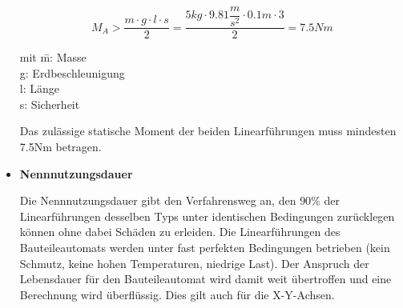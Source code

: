 \begin{itemize}
\begin{figure}[htbp]
\end{figure}


\[M_A>\dfrac{m\cdot g \cdot l \cdot s}{2}=\dfrac{5kg\cdot 9.81\dfrac{m}{s^2}\cdot 0.1m\cdot 3}{2}=7.5Nm\]


\begin{tabbing}
mit \=m: Masse\\
		\>g: Erdbeschleunigung\\
		\>l: Länge\\
		\>s: Sicherheit\\
\end{tabbing}


Das zulässige statische Moment der beiden Linearführungen muss mindesten 7.5Nm betragen.\\



\item \textbf{Nennnutzungsdauer}

Die Nennnutzungsdauer gibt den Verfahrensweg an, den $90\%$ der Linearführungen desselben Typs unter identischen 
Bedingungen zurücklegen können ohne dabei Schäden zu erleiden. Die Linearführungen des Bauteileautomats werden unter 
fast perfekten Bedingungen betrieben (kein Schmutz, keine hohen Temperaturen, niedrige Last). Der Anspruch der Lebensdauer für den Bauteileautomat wird damit weit übertroffen und eine Berechnung wird überflüssig. Dies gilt auch für die X-Y-Achsen.
\newline




		


		
		


\end {itemize}






